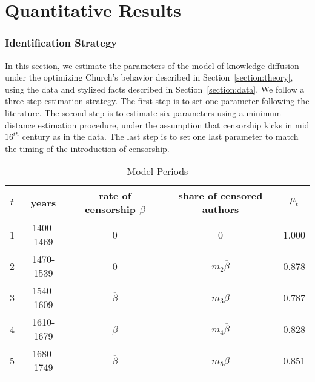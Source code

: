 
\section{Quantitative Results}\label{section:identification}

\subsubsection*{Identification Strategy}

In this section, we estimate the parameters of the model of knowledge diffusion under the optimizing Church's behavior described in Section~\ref{section:theory}, using the data and stylized facts described in Section~\ref{section:data}. We follow a three-step estimation strategy. The first step is to set one parameter following the literature. The second step is to estimate six parameters using a minimum distance estimation procedure, under the assumption that censorship kicks in mid $16^{th}$ century as in the data. The last step is to set one last parameter to match the timing of the introduction of censorship.


\begin{table}[htb]
      \centering %
\begin{tabular}{ccccc}
\toprule
$t$         &   years       & rate of censorship $\beta $  & share of censored authors & $\mu_t$ \\
\midrule
1           & 1400-1469     & 0                            & 0                        & 1.000\\
2           & 1470-1539     & 0                            & $m_2\overline{\beta}$    &  0.878\\
3           & 1540-1609     & $\overline{\beta}$           & $m_3\overline{\beta}$    & 0.787\\
4           & 1610-1679     & $\overline{\beta}$           & $m_4\overline{\beta}$    & 0.828\\
5           & 1680-1749     & $\overline{\beta}$           & $m_5\overline{\beta}$    & 0.851\\
\bottomrule
\end{tabular}
\caption{Model Periods}\label{tab:periods}
\end{table}

